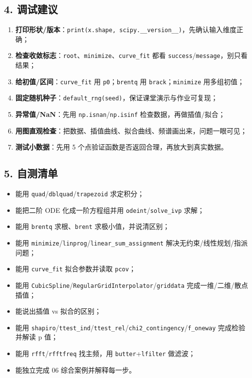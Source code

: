 \subsection{4. 调试建议}\label{ux8c03ux8bd5ux5efaux8bae-2}

\begin{enumerate}
\def\labelenumi{\arabic{enumi}.}
\tightlist
\item
  \textbf{打印形状/版本}：\texttt{print(x.shape,\ scipy.\_\_version\_\_)}，先确认输入维度正确；
\item
  \textbf{检查收敛标志}：\texttt{root}、\texttt{minimize}、\texttt{curve\_fit}
  都看 \texttt{success}/\texttt{message}，别只看结果；
\item
  \textbf{给初值/区间}：\texttt{curve\_fit} 用
  \texttt{p0}；\texttt{brentq} 用 \texttt{brack}；\texttt{minimize}
  用多组初值；
\item
  \textbf{固定随机种子}：\texttt{default\_rng(seed)}，保证课堂演示与作业可复现；
\item
  \textbf{异常值/NaN}：先用 \texttt{np.isnan}/\texttt{np.isinf}
  检查数据，再做插值/拟合；
\item
  \textbf{用图直观检查}：把数据、插值曲线、拟合曲线、频谱画出来，问题一眼可见；
\item
  \textbf{测试小数据}：先用 5
  个点验证函数是否返回合理，再放大到真实数据。
\end{enumerate}

\subsection{5. 自测清单}\label{ux81eaux6d4bux6e05ux5355}

\begin{itemize}
\tightlist
\item[$\square$]
  能用 \texttt{quad}/\texttt{dblquad}/\texttt{trapezoid} 求定积分；
\item[$\square$]
  能把二阶 ODE 化成一阶方程组并用 \texttt{odeint}/\texttt{solve\_ivp}
  求解；
\item[$\square$]
  能用 \texttt{brentq} 求根、\texttt{brent} 求极小值，并说清区别；
\item[$\square$]
  能用
  \texttt{minimize}/\texttt{linprog}/\texttt{linear\_sum\_assignment}
  解决无约束/线性规划/指派问题；
\item[$\square$]
  能用 \texttt{curve\_fit} 拟合参数并读取 \texttt{pcov}；
\item[$\square$]
  能用
  \texttt{CubicSpline}/\texttt{RegularGridInterpolator}/\texttt{griddata}
  完成一维/二维/散点插值；
\item[$\square$]
  能说出插值 vs 拟合的区别；
\item[$\square$]
  能用
  \texttt{shapiro}/\texttt{ttest\_ind}/\texttt{ttest\_rel}/\texttt{chi2\_contingency}/\texttt{f\_oneway}
  完成检验并解读 p 值；
\item[$\square$]
  能用 \texttt{rfft}/\texttt{rfftfreq} 找主频，用
  \texttt{butter}+\texttt{lfilter} 做滤波；
\item[$\square$]
  能独立完成 06 综合案例并解释每一步。
\end{itemize}

